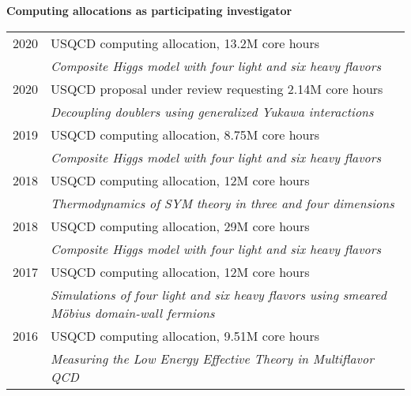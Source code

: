 \begin{spacelist}
  \vspace{18 pt}
  \item {\large \bfseries Computing allocations as participating investigator} \\[10 pt]
    \begin{tabular}[t]{cl}
      2020 & USQCD computing allocation, 13.2M core hours                                                         \\ %
           & \textit{Composite Higgs model with four light and six heavy flavors}                                 \\[6 pt]
      2020 & USQCD proposal under review requesting 2.14M core hours                                              \\ %
           & \textit{Decoupling doublers using generalized Yukawa interactions}                                   \\[6 pt]
      2019 & USQCD computing allocation, 8.75M core hours                                                         \\ %
           & \textit{Composite Higgs model with four light and six heavy flavors}                                 \\[6 pt]
      2018 & USQCD computing allocation, 12M core hours                                                           \\ %
           & \textit{Thermodynamics of SYM theory in three and four dimensions}                                   \\[6 pt]
      2018 & USQCD computing allocation, 29M core hours                                                           \\ %
           & \textit{Composite Higgs model with four light and six heavy flavors}                                 \\[6 pt]
      2017 & USQCD computing allocation, 12M core hours                                                           \\ %
           & \textit{Simulations of four light and six heavy flavors using smeared M\"obius domain-wall fermions} \\[6 pt]
      2016 & USQCD computing allocation, 9.51M core hours                                                         \\ %
           & \textit{Measuring the Low Energy Effective Theory in Multiflavor QCD}                                \\[6 pt]

\end{tabular}
\end{spacelist}
